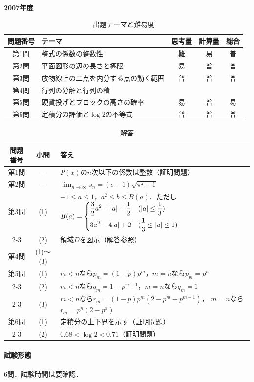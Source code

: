 \documentclass[../../main.tex]{subfiles}
\begin{document}
\begin{center}
  {\fontsize{48pt}{58pt}\selectfont \textbf{2007}\normalsize\textbf{年度}}
\end{center}

\begin{table}[htb]
  \centering
  \caption{出題テーマと難易度}
  \begin{tabular}{|c|p{6.2cm}|c|c|c|}
    \hline
    \textbf{問題番号} & \textbf{テーマ} & \textbf{思考量} & \textbf{計算量} & \textbf{総合} \\
    \hline
    第1問 & 整式の係数の整数性 & 難 & 易 & 普 \\
    \hline
    第2問 & 平面図形の辺の長さと極限 & 易 & 普 & 普 \\
    \hline
    第3問 & 放物線上の二点を内分する点の動く範囲 & 普 & 普 & 普 \\
    \hline
    第4問 & 行列の分解と行列の積 &  &  &  \\
    \hline
    第5問 & 硬貨投げとブロックの高さの確率 & 易 & 普 & 易 \\
    \hline
    第6問 & 定積分の評価と$\log 2$の不等式 & 普 & 普 & 普 \\
    \hline
  \end{tabular}
\end{table}

\begin{table}[htb]
  \centering
  \caption{解答}
  \renewcommand{\arraystretch}{1.4}
  \begin{tabular}{|c|c|p{9cm}|}
    \hline
    \textbf{問題番号} & \textbf{小問} & \textbf{答え} \\
    \hline
    第1問 & -- & $P(x)$の$n$次以下の係数は整数（証明問題） \\
    \hline
    第2問 & -- & $\displaystyle\lim_{n\to\infty}s_n
    =(e-1)\sqrt{\pi^2+1}$ \\
    \hline
    第3問 & (1) & $-1\le a\le1$，$a^2\le b\le B(a)$．ただし
    $B(a)=
    \begin{dcases}
      \dfrac{3}{2}a^2+|a|+\dfrac{1}{2} & (|a|\le\dfrac{1}{3}) \\
      3a^2-4|a|+2 & (\dfrac{1}{3}\le|a|\le1)
    \end{dcases}$ \\
    \cline{2-3}
    & (2) & 領域$D$を図示（解答参照） \\
    \hline
    第4問 & (1)〜(3) & \\
    \hline
    第5問 & (1) & $m<n$なら$p_m=(1-p)p^m$，$m=n$なら$p_m=p^n$ \\
    \cline{2-3}
    & (2) & $m<n$なら$q_m=1-p^{m+1}$，$m=n$なら$q_m=1$ \\
    \cline{2-3}
    & (3) & $m<n$なら$r_m=(1-p)p^m(2-p^m-p^{m+1})$，
    $m=n$なら$r_m=p^n(2-p^n)$ \\
    \hline
    第6問 & (1) & 定積分の上下界を示す（証明問題） \\
    \cline{2-3}
    & (2) & $0.68<\log 2<0.71$（証明問題） \\
    \hline
  \end{tabular}
\end{table}

\paragraph{試験形態}
6問．試験時間は要確認．
\end{document}
